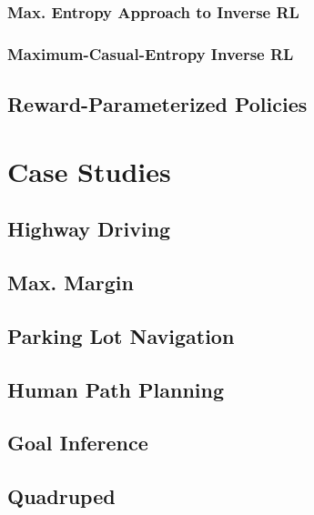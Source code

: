 			\subsubsection{Max. Entropy Approach to Inverse RL} %

			\subsubsection{Maximum-Casual-Entropy Inverse RL} %

		\subsection{Reward-Parameterized Policies} %

	\section{Case Studies} %

		\subsection{Highway Driving} %

		\subsection{Max. Margin} %

		\subsection{Parking Lot Navigation} %

		\subsection{Human Path Planning} %

		\subsection{Goal Inference} %

		\subsection{Quadruped} %

